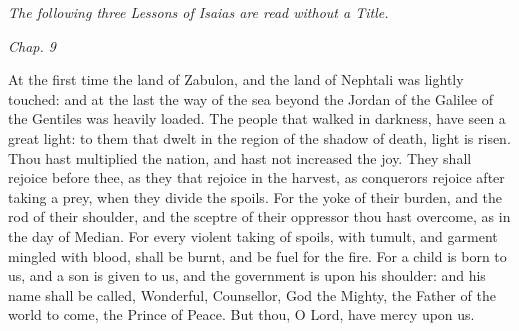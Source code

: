 {{    \emph{The following three Lessons of Isaias are read without a Title.}
  }

  {
    \hspace{10ex}{Lesson I.}\hfill\emph{Chap. 9}\hspace{10ex}

    \begin{parcolumns}[rulebetween,colwidths={1=.51\linewidth}]{2}
    {At the first time the land of Zabulon, and the land of Nephtali was lightly touched: and at the last the way of the sea beyond the Jordan of the Galilee of the Gentiles was heavily loaded.
      The people that walked in darkness, have seen a great light: to them that dwelt in the region of the shadow of death, light is risen.
      Thou hast multiplied the nation, and hast not increased the joy. They shall rejoice before thee, as they that rejoice in the harvest, as conquerors rejoice after taking a prey, when they divide the spoils.
      For the yoke of their burden, and the rod of their shoulder, and the sceptre of their oppressor thou hast overcome, as in the day of Median.
      For every violent taking of spoils, with tumult, and garment mingled with blood, shall be burnt, and be fuel for the fire.
      For a child is born to us, and a son is given to us, and the government is upon his shoulder: and his name shall be called, Wonderful, Counsellor, God the Mighty, the Father of the world to come, the Prince of Peace.
      But thou, O Lord, have mercy upon us.}
    \end{parcolumns}

  }

}
